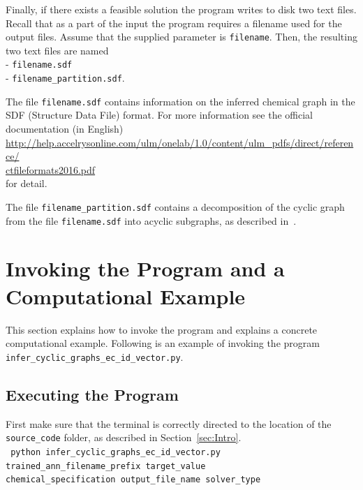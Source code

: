\documentclass[11pt, titlepage, dvipdfmx, twoside]{article}
\begin{document}
Finally, if there exists a feasible solution the program writes to disk two text files.
Recall that as a part of the input the program requires a filename
used for the output files. 
Assume that the supplied parameter is {\tt filename}.
Then, the resulting two text files are named \\
- {\tt filename.sdf} \\
- {\tt filename\_partition.sdf}. 

\noindent
The file {\tt filename.sdf} contains information
on the inferred chemical graph in the SDF (Structure Data File)
format.
For more information see the official documentation (in English) \\
\url{http://help.accelrysonline.com/ulm/onelab/1.0/content/ulm_pdfs/direct/reference/}\\
 \url{ctfileformats2016.pdf} \\
for detail.

\noindent
The file {\tt filename\_partition.sdf} contains a 
decomposition of the cyclic graph from the 
file {\tt filename.sdf} into acyclic subgraphs,
as described in~\cite{cyclic_BH_arxiv}.



\section{Invoking the Program and a Computational Example}
\label{sec:Exp}

This section explains how to invoke the program
and explains a concrete computational example.
Following is an example of invoking the
program {\tt infer\_cyclic\_graphs\_ec\_id\_vector.py}.

 


\subsection{Executing the Program}
\label{sec:Exp_1}

First make sure that the terminal is 
correctly directed to the location
of the {\tt source\_code} folder, as described in Section~\ref{sec:Intro}. \\

\noindent
{\tt 
 python  infer\_cyclic\_graphs\_ec\_id\_vector.py 
trained\_ann\_filename\_prefix
target\_value \\
 \phantom{python } 
 chemical\_specification
output\_file\_name
solver\_type
 }\\
\end{document}
